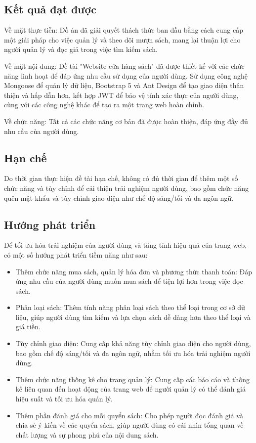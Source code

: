 {}
\setcounter{section}{5}
\setcounter{subsection}{0}


\subsection{Kết quả đạt được}
Về mặt thực tiễn: Đồ án đã giải quyết thách thức ban đầu bằng cách cung cấp một giải pháp cho việc quản lý và theo dõi mượn sách, mang lại thuận lợi cho người quản lý và đọc giả trong việc tìm kiếm sách.
\par
Về mặt nội dung: Đề tài "Website cửa hàng sách" đã được thiết kế với các chức năng linh hoạt để đáp ứng nhu cầu sử dụng của người dùng. Sử dụng công nghệ Mongoose để quản lý dữ liệu, Bootstrap 5 và Ant Design để tạo giao diện thân thiện và hấp dẫn hơn, kết hợp JWT để bảo vệ tính xác thực của người dùng, cùng với các công nghệ khác để tạo ra một trang web hoàn chỉnh.
\par
Về chức năng: Tất cả các chức năng cơ bản đã được hoàn thiện, đáp ứng đầy đủ nhu cầu của người dùng.


\subsection{Hạn chế}
Do thời gian thực hiện đề tài hạn chế, không có đủ thời gian để thêm một số chức năng và tùy chỉnh để cải thiện trải nghiệm người dùng, bao gồm chức năng quên mật khẩu và tùy chỉnh giao diện như chế độ sáng/tối và đa ngôn ngữ.



\subsection{Hướng phát triển}
Để tối ưu hóa trải nghiệm của người dùng và tăng tính hiệu quả của trang web, có một số hướng phát triển tiềm năng như sau:

\begin{itemize}[label={+}]
          \item Thêm chức năng mua sách, quản lý hóa đơn và phương thức thanh toán: Đáp ứng nhu cầu của người dùng muốn mua sách để tiện lợi hơn trong việc đọc sách.
          \item Phân loại sách: Thêm tính năng phân loại sách theo thể loại trong cơ sở dữ liệu, giúp người dùng tìm kiếm và lựa chọn sách dễ dàng hơn theo thể loại và giá tiền.
          \item Tùy chỉnh giao diện: Cung cấp khả năng tùy chỉnh giao diện cho người dùng, bao gồm chế độ sáng/tối và đa ngôn ngữ, nhằm tối ưu hóa trải nghiệm người dùng.
          \item Thêm chức năng thống kê cho trang quản lý: Cung cấp các báo cáo và thống kê liên quan đến hoạt động của trang web để người quản lý có thể đánh giá hiệu suất và tối ưu hóa quản lý.
          \item Thêm phần đánh giá cho mỗi quyển sách: Cho phép người đọc đánh giá và chia sẻ ý kiến về các quyển sách, giúp người dùng có cái nhìn tổng quan về chất lượng và sự phong phú của nội dung sách.
        \end{itemize}